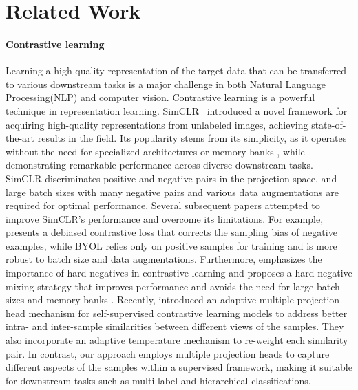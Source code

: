 \section{Related Work}
\label{relatedwork}
\paragraph{Contrastive learning}
Learning a high-quality representation of the target data that can be transferred to various downstream tasks is a major challenge in both 
Natural Language Processing(NLP) and computer vision. Contrastive learning is a powerful technique in representation learning. SimCLR~\citep{chen2020simple} introduced a novel framework for acquiring high-quality representations from unlabeled images, achieving state-of-the-art results in the field. Its popularity stems from its simplicity, as it operates without the need for specialized architectures \citep{bachman2019learning, henaff2020data} or memory banks \citep{he2020momentum, wu2018unsupervised}, while demonstrating remarkable performance across diverse downstream tasks. SimCLR discriminates positive and negative pairs in the projection space, and large batch sizes with many negative pairs and various data augmentations are required for optimal performance. 
Several subsequent papers attempted to improve SimCLR’s performance and overcome its limitations. For example, \citet{chuang2020debiased} presents a debiased contrastive loss that corrects the sampling bias of negative examples, while BYOL \citep{grill2020bootstrap} relies only on positive samples for training and is more robust to batch size and data augmentations. Furthermore, \citet{kalantidis2020hard} emphasizes the importance of hard negatives in contrastive learning and proposes a hard negative mixing strategy that improves performance and avoids the need for large batch sizes and memory banks \citep{mocov2}. Recently, \citet{wang2023adaptive} introduced an adaptive multiple projection head mechanism for self-supervised contrastive learning models to address better intra- and inter-sample similarities between different views of the samples. They also incorporate an adaptive temperature mechanism to re-weight each similarity pair. In contrast, our approach employs multiple projection heads to capture different aspects of the samples within a supervised framework, making it suitable for downstream tasks such as multi-label and hierarchical classifications.

